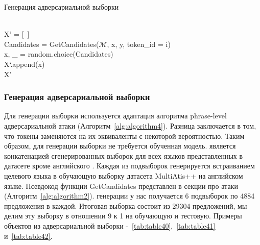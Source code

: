 \begin{algorithm}
    \caption{Генерация адверсариальной выборки}
    \begin{algorithmic}
         \\
        X' = [~]
                    \\
                    \ind\ind\ind Candidates = GetCandidates($\mathcal{M}$, x, y, token\_id = i)
                    \ind{}
                            \\
                            \ind\ind\ind\ind x, \_ = random.choice(Candidates)
                    \EndIf
                \EndFor \\
                \ind\ind X`.append(x)
            \EndFor
        \EndFor \\
        \Return X'
    \end{algorithmic}\label{alg:algorithm4}
\end{algorithm}

\subsubsection{Генерация адверсариальной выборки}
Для генерации выборки используется адаптация алгоритма phrase-level адверсариальной атаки (Алгоритм~\eqref{alg:algorithm4}).
Разница заключается в том, что токены заменяются на их эквиваленты с некоторой вероятностью.
Таким образом, для генерации выборки не требуется обученная модель.
 является конкатенацией сгенерированных выборок для всех языков представленных в датасете кроме английского .
Каждая из подвыборок генерируется встраиванием целевого языка в обучающую выборку датасета MultiAtis++ на английском языке.
Псевдокод функции GetCandidates представлен в секции про атаки (Алгоритм~\eqref{alg:algorithm2}).
 генерации у нас получается 6 подвыборок по 4884 предложения в каждой.
Итоговая выборка состоит из 29304 предложений, мы делим эту выборку в отношении 9 к 1 на обучающую и тестовую.
Примеры объектов из адверсариальной выборки -~\eqref{tab:table40},~\eqref{tab:table41} и~\eqref{tab:table42}.



